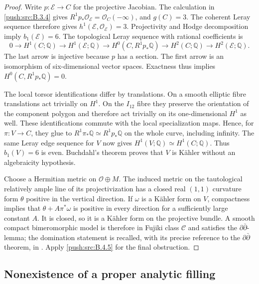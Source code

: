 \begin{proof}
Write $p:\mathscr E\to C$ for the projective Jacobian.
The calculation in \ref{push:src:B.3.4} gives
$R^1p_*\mathcal O_{\mathscr E}=\mathcal O_C(-\infty)$,
and $g(C)=3$. The coherent Leray sequence therefore gives
$h^1(\mathscr E,\mathcal O_{\mathscr E})=3$. Projectivity
and Hodge decomposition imply $b_1(\mathscr E)=6$.
The topological Leray sequence with rational coefficients is
\[
 0\longrightarrow H^1(C;\mathbb Q)
 \longrightarrow H^1(\mathscr E;\mathbb Q)
 \longrightarrow H^0(C,R^1p_*\mathbb Q)
 \longrightarrow H^2(C;\mathbb Q)
 \longrightarrow H^2(\mathscr E;\mathbb Q).
\]
The last arrow is injective because $p$ has a section.
The first arrow is an isomorphism of six-dimensional
vector spaces. Exactness thus implies
$H^0(C,R^1p_*\mathbb Q)=0$.

The local torsor identifications differ by translations.
On a smooth elliptic fibre translations act trivially on
$H^1$. On the $I_{12}$ fibre they preserve the orientation
of the component polygon and therefore act trivially on
its one-dimensional $H^1$ as well. These identifications
commute with the local specialization maps. Hence, for
$\pi:V\to C$, they glue to
$R^1\pi_*\mathbb Q\simeq R^1p_*\mathbb Q$ on the whole
curve, including infinity. The same Leray edge sequence
for $V$ now gives
$H^1(V;\mathbb Q)\simeq H^1(C;\mathbb Q)$.
Thus $b_1(V)=6$ is even. Buchdahl's theorem
\cite[Theorem 11, p.297]{Buchdahl1999} proves that $V$
is K\"ahler without an algebraicity hypothesis.

Choose a Hermitian metric on $\mathcal O\oplus M$.
The induced metric on the tautological relatively ample
line of its projectivization has a closed real $(1,1)$
curvature form $\theta$ positive in the vertical direction.
If $\omega$ is a K\"ahler form on $V$, compactness implies
that $\theta+A\pi^*\omega$ is positive in every direction
for a sufficiently large constant $A$. It is closed, so
it is a K\"ahler form on the projective bundle. A smooth
compact bimeromorphic model is therefore in Fujiki class
$\mathcal C$ and satisfies the $\partial\bar\partial$-lemma;
the domination statement is recalled, with its precise
reference to the $\partial\bar\partial$ theorem, in
\cite[Section 2.1, p.8]{Chen2026HodgeRoot}. Apply \ref{push:src:B.4.5}
for the final obstruction.
\end{proof}


\subsection{Nonexistence of a proper analytic filling}

